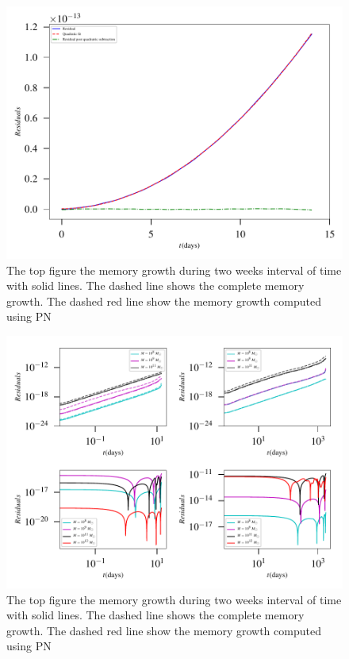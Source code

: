 \documentclass[twocolumn,showpacs,aps,prd,nobibnotes,floatfix]{revtex4-1}
\begin{document}
\begin{widetext}
\begin{figure}
	\includegraphics[width=7.5in]{../plots/PlotfromMathematicaData/ResidualGrowth2weeksQuadFitInDays.pdf}
	\caption{The top figure the memory growth during two weeks interval of time with solid lines. The dashed line shows the complete memory growth. The dashed red line show the memory growth computed using PN}
	\label{fig:resedualG}
\end{figure} 

\begin{figure}
	\includegraphics[width=7.5in]{../plots/PlotfromMathematicaData/ResidualGrowth2weeksDiffSpinsInDays.pdf}
	\caption{The top figure the memory growth during two weeks interval of time with solid lines. The dashed line shows the complete memory growth. The dashed red line show the memory growth computed using PN}
	\label{fig:resedualGrowth}
\end{figure} 


\end{widetext}
\end{document}
